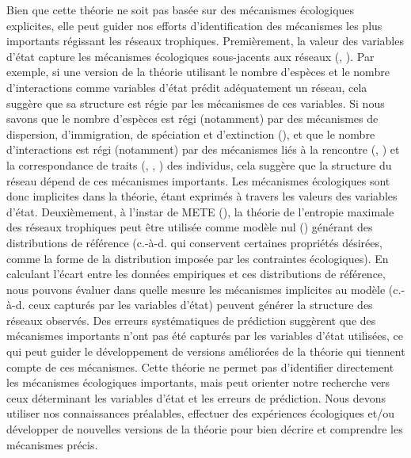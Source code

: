 Bien que cette théorie ne soit pas basée sur des mécanismes écologiques
explicites, elle peut guider nos efforts d'identification des mécanismes les
plus importants régissant les réseaux trophiques. Premièrement, la valeur des
variables d'état capture les mécanismes écologiques sous-jacents aux réseaux
(\cite{White2012Characterizing}, \cite{McGill2010Mechanisms}). Par exemple, si
une version de la théorie utilisant le nombre d'espèces et le nombre
d'interactions comme variables d'état prédit adéquatement un réseau, cela
suggère que sa structure est régie par les mécanismes de ces variables. Si nous
savons que le nombre d'espèces est régi (notamment) par des mécanismes de
dispersion, d'immigration, de spéciation et d'extinction
(\cite{Whittaker2001Scale}), et que le nombre d'interactions est régi
(notamment) par des mécanismes liés à la rencontre (\cite{Canard2012Emergence},
\cite{Canard2014Empirical}) et la correspondance de traits
(\cite{Bolnick2011Why}, \cite{Gravel2013Inferring}, \cite{Stouffer2011Role}) des
individus, cela suggère que la structure du réseau dépend de ces mécanismes
importants. Les mécanismes écologiques sont donc implicites dans la théorie,
étant exprimés à travers les valeurs des variables d'état. Deuxièmement, à
l'instar de METE (\cite{Harte2014Maximum}), la théorie de l'entropie maximale
des réseaux trophiques peut être utilisée comme modèle nul
(\cite{Fortuna2006Habitat}) générant des distributions de référence (c.-à-d. qui
conservent certaines propriétés désirées, comme la forme de la distribution
imposée par les contraintes écologiques). En calculant l'écart entre les données
empiriques et ces distributions de référence, nous pouvons évaluer dans quelle
mesure les mécanismes implicites au modèle (c.-à-d. ceux capturés par les
variables d'état) peuvent générer la structure des réseaux observés. Des erreurs
systématiques de prédiction suggèrent que des mécanismes importants n'ont pas
été capturés par les variables d'état utilisées, ce qui peut guider le
développement de versions améliorées de la théorie qui tiennent compte de ces
mécanismes. Cette théorie ne permet pas d'identifier directement les mécanismes
écologiques importants, mais peut orienter notre recherche vers ceux déterminant
les variables d'état et les erreurs de prédiction. Nous devons utiliser nos
connaissances préalables, effectuer des expériences écologiques et/ou développer
de nouvelles versions de la théorie pour bien décrire et comprendre les
mécanismes précis.



